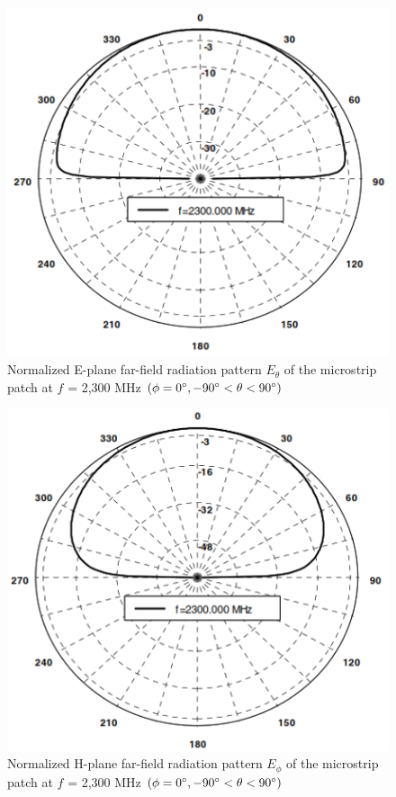 \documentclass[11pt,a4paper,hidelinks]{article}
\begin{document}
      \begin{figure}
        \includegraphics{rad1.png}
        \centering
        \caption{Normalized E-plane far-field radiation pattern $E_\theta$ of the microstrip patch at $f$ = 2,300 MHz $(\phi = 0\degree, -90\degree < \theta < 90\degree)$ \cite{NoK:05}}
      \end{figure}

      \begin{figure}
        \includegraphics{rad2.png}
        \centering
        \caption{Normalized H-plane far-field radiation pattern $E_\phi$ of the microstrip patch at $f$ = 2,300 MHz $(\phi = 0\degree, -90\degree < \theta < 90\degree)$ \cite{NoK:05}}
      \end{figure}
\end{document}
